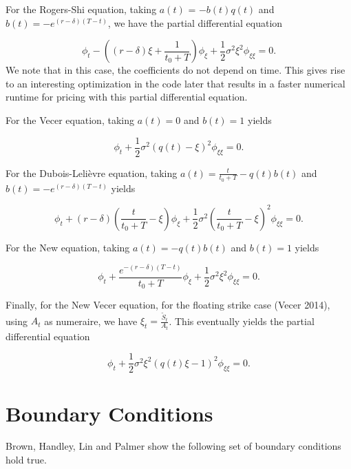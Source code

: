 \documentclass[12pt]{report}
\begin{document}
For the Rogers-Shi equation, taking \(a(t)\) = \(-b(t)q(t)\) and \(b(t) = -e^{(r-\delta)(T-t)}\), we have the partial differential equation

\begin{equation}
  \phi_t - ( (r-\delta)\xi + \frac{1}{t_0 + T} )\phi_\xi + \frac{1}{2}\sigma^2\xi^2\phi_{\xi\xi} = 0.
\end{equation}We note that in this case, the coefficients do not depend on time. This gives rise to an interesting optimization in the code later that results in a faster numerical runtime for pricing with this partial differential equation.

For the Vecer equation, taking \(a(t) = 0\) and \(b(t)=1\) yields

\begin{equation}
  \phi_t + \frac{1}{2}\sigma^2(q(t) - \xi)^2\phi_{\xi\xi} = 0.
\end{equation}

For the Dubois-Leli\`{e}vre equation, taking \(a(t) = \frac{t}{t_0 + T} - q(t)b(t)\) and \(b(t)=-e^{(r-\delta)(T-t)}\) yields

\begin{equation}
  \phi_t + (r-\delta)(\frac{t}{t_0 + T} - \xi)\phi_\xi + \frac{1}{2}\sigma^2(\frac{t}{t_0 + T} - \xi)^2\phi_{\xi\xi} = 0.
\end{equation}

For the New equation, taking \(a(t) = -q(t)b(t)\) and \(b(t) = 1\) yields

\begin{equation}
  \phi_t + \frac{e^{-(r-\delta)(T-t)}}{t_0 + T}\phi_\xi + \frac{1}{2}\sigma^2\xi^2\phi_{\xi\xi} = 0.
\end{equation}

Finally, for the New Vecer equation, for the floating strike case (Vecer 2014), using \(A_t\) as numeraire, we have \(\xi_t = \frac{\tilde{S}_t}{A_t}\). This eventually yields the partial differential equation %

\begin{equation}
  \phi_t + \frac{1}{2}\sigma^2\xi^2(q(t)\xi - 1)^2 \phi_{\xi\xi} = 0.
\end{equation}

\section{Boundary Conditions}
Brown, Handley, Lin and Palmer\cite{main_paper} show the following set of boundary conditions hold true.
\end{document}
